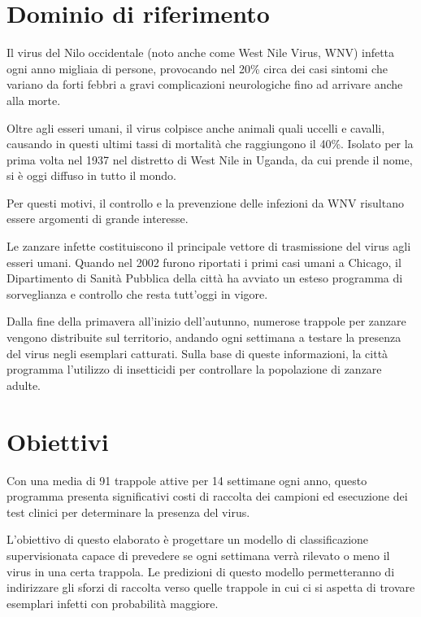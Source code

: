 \section{Dominio di riferimento}

Il virus del Nilo occidentale (noto anche come West Nile Virus, WNV) infetta 
ogni anno migliaia di persone, provocando nel 20\% circa dei casi sintomi che 
variano da forti febbri a gravi complicazioni neurologiche fino ad arrivare  
anche alla morte.

Oltre agli esseri umani, il virus colpisce anche animali quali uccelli e 
cavalli, causando in questi ultimi tassi di mortalità che raggiungono il 40\%. 
Isolato per la prima volta nel 1937 nel distretto di West Nile in Uganda, da 
cui prende il nome, si è oggi diffuso in tutto il mondo.

Per questi motivi, il controllo e la prevenzione delle infezioni da WNV 
risultano essere argomenti di grande interesse. 

Le zanzare infette costituiscono il principale vettore di trasmissione del 
virus agli esseri umani. Quando nel 2002 furono riportati i primi casi umani a 
Chicago, il Dipartimento di Sanità Pubblica della città ha avviato un esteso 
programma di sorveglianza e controllo che resta tutt'oggi in vigore.

Dalla fine della primavera all'inizio dell'autunno, numerose trappole per 
zanzare vengono distribuite sul territorio, andando ogni settimana a testare la 
presenza del virus negli esemplari catturati. Sulla base di queste 
informazioni, la città programma l'utilizzo di insetticidi per controllare la 
popolazione di zanzare adulte.

\section{Obiettivi}

Con una media di 91 trappole attive per 14 settimane ogni anno, questo 
programma presenta significativi costi di raccolta dei campioni ed esecuzione 
dei test clinici per determinare la presenza del virus.



L'obiettivo di questo elaborato è progettare un modello di classificazione 
supervisionata capace di prevedere se ogni settimana verrà rilevato o meno il 
virus in una certa trappola. Le predizioni di questo modello permetteranno di 
indirizzare gli sforzi di raccolta verso quelle trappole in cui ci si aspetta 
di trovare esemplari infetti con probabilità maggiore.

